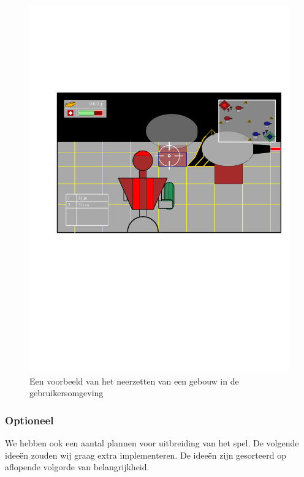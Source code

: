 \documentclass[a4paper,11pt, twoside]{article}
\begin{document}
    \begin{figure}
    \centering
    \includegraphics[width=\textwidth]{../Graphics/UI2.pdf}
    \caption{Een voorbeeld van het neerzetten van een gebouw in de gebruikersomgeving}
    \label{fig:gebouw}
    \end{figure}

    \subsubsection{Optioneel}
    \label{sec:OPT}
    We hebben ook een aantal plannen voor uitbreiding van het spel. De volgende idee\"en zouden wij graag extra implementeren. De idee\"en zijn gesorteerd op aflopende volgorde van belangrijkheid.
\end{document}
